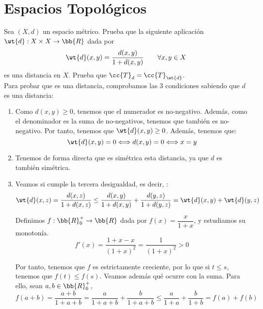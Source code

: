 \section{Espacios Topológicos}

\begin{ejercicio}
    Sea $(X,d)$ un espacio métrico. Prueba que la siguiente aplicación $\wt{d}:X\times X\to \bb{R}$ dada por
    \begin{equation*}
        \wt{d}(x,y)=\frac{d(x,y)}{1+d(x,y)} \qquad \forall x,y\in X
    \end{equation*}
    es una distancia en $X$. Prueba que $\cc{T}_d=\cc{T}_{\wt{d}}$.\\

    Para probar que es una distancia, comprobamos las 3 condiciones sabiendo que $d$ es una distancia:
    \begin{enumerate}
        \item Como $d(x,y)\geq 0$, tenemos que el numerador es no-negativo. Además, como el denominador es la suma de no-negativos, tenemos que también es no-negativo. Por tanto, tenemos que $\wt{d}(x,y)\geq 0$. Además, tenemos que:
        \begin{equation*}
            \wt{d}(x,y) = 0 \Longleftrightarrow d(x,y)=0 \Longleftrightarrow x=y
        \end{equation*}

        \item Tenemos de forma directa que es simétrica esta distancia, ya que $d$ es también simétrica.

        \item Veamos si cumple la tercera desigualdad, es decir, :
        \begin{equation*}
            \wt{d}(x,z) = \frac{d(x,z)}{1+d(x,z)} \leq \frac{d(x,y)}{1+d(x,y)} + \frac{d(y,z)}{1+d(y,z)} = \wt{d}(x,y) + \wt{d}(y,z)
        \end{equation*}

        Definimos $f:\bb{R}^+_0\to \bb{R}$ dada por $f(x)=\dfrac{x}{1+x}$, y estudiamos su monotonía.
        $$f'(x)=\frac{1+x -x}{(1+x)^2} = \frac{1}{(1+x)^2}>0$$
        
        Por tanto, tenemos que $f$ es estrictamente creciente, por lo que si $t\leq s$, tenemos que $f(t)\leq f(s)$. Veamos además qué ocurre con la suma. Para ello, sean $a,b\in \bb{R}^+_0$,
        \begin{equation*}
            f(a+b)=\frac{a+b}{1+a+b} = \frac{a}{1+a+b} + \frac{b}{1+a+b} \leq \frac{a}{1+a} + \frac{b}{1+b} = f(a)+f(b)
        \end{equation*}
        

\end{enumerate}
\end{ejercicio}

